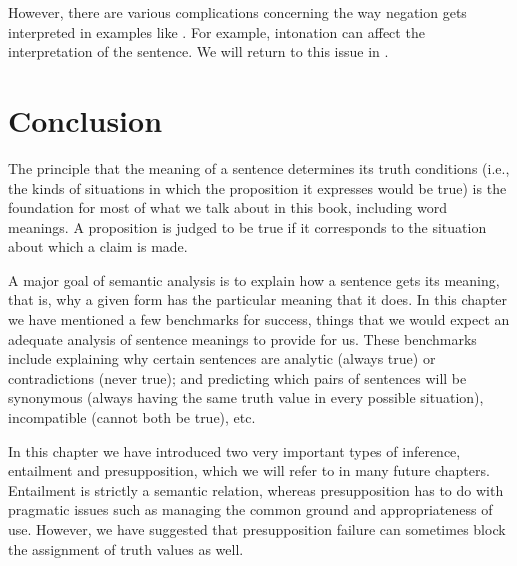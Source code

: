 However, there are various complications concerning the way negation gets interpreted in examples like . For example, intonation can affect the interpretation of the sentence. We will return to this issue in .


\section{Conclusion}\label{sec:3.5}

The principle that the meaning of a sentence determines its truth conditions (i.e., the kinds of situations in which the proposition it expresses would be true) is the foundation for most of what we talk about in this book, including word meanings. A proposition is judged to be true if it corresponds to the situation about which a claim is made.



A major goal of semantic analysis is to explain how a sentence gets its meaning, that is, why a given form has the particular meaning that it does. In this chapter we have mentioned a few benchmarks for success, things that we would expect an adequate analysis of sentence meanings to provide for us. These benchmarks include explaining why certain sentences are analytic (always true) or contradictions (never true); and predicting which pairs of sentences will be synonymous (always having the same truth value in every possible situation), incompatible (cannot both be true), etc.



In this chapter we have introduced two very important types of inference, entailment and presupposition, which we will refer to in many future chapters. Entailment is strictly a semantic relation, whereas presupposition has to do with pragmatic issues such as managing the common ground and appropriateness of use. However, we have suggested that presupposition failure can sometimes block the assignment of truth values as well.




